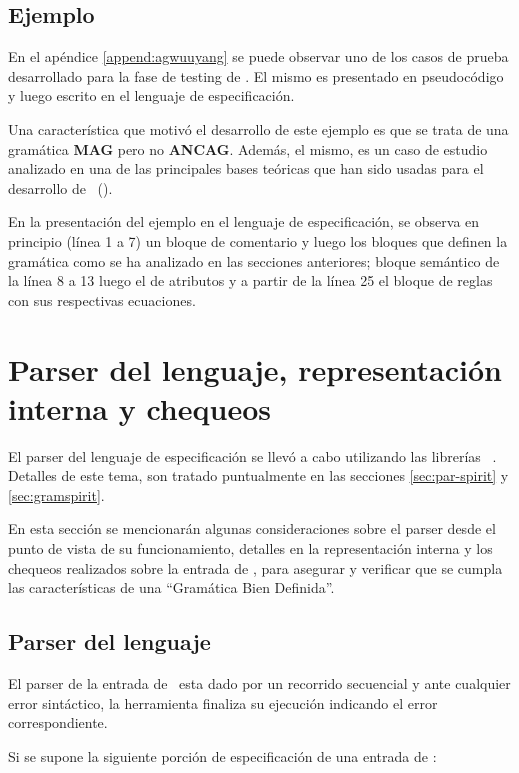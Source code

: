 \subsection{Ejemplo}

En el apéndice \ref{append:agwuuyang} se puede observar uno de los casos de prueba desarrollado para la fase de testing de \maggen. El mismo es presentado en pseudocódigo y luego escrito en el lenguaje de especificación. 

Una característica que motivó el desarrollo de este ejemplo es que se trata de una gramática \textbf{MAG} pero no \textbf{ANCAG}. Además, el mismo, es un caso de estudio analizado en una de las principales bases teóricas que han sido usadas para el desarrollo de \maggen\ (\cite{wuu-yang1}). 

En la presentación del ejemplo en el lenguaje de especificación, se observa en principio (línea 1 a 7) un bloque de comentario y luego los bloques que definen la gramática como se ha analizado en las secciones anteriores; bloque semántico de la línea 8 a 13 luego el de atributos y a partir de la línea 25 el bloque de reglas con sus respectivas ecuaciones.

 
\section{Parser del lenguaje, representación interna y chequeos}

El parser del lenguaje de especificación se llevó a cabo utilizando las librerías \boost\ \spirit. Detalles de este tema, son tratado puntualmente en las secciones \ref{sec:par-spirit} y \ref{sec:gramspirit}. 

En esta sección se mencionarán algunas consideraciones sobre el parser desde el punto de vista de su funcionamiento, detalles en la representación interna y los chequeos realizados sobre la entrada de \maggen, para asegurar y verificar que se cumpla las características de una ``Gramática Bien Definida''.

\subsection{Parser del lenguaje}
\label{subsec:parsers-leng}
El parser de la entrada de \maggen\ esta dado por un recorrido secuencial y ante cualquier error sintáctico, la herramienta finaliza su ejecución indicando el error correspondiente. 

Si se supone la siguiente porción de especificación de una entrada de \maggen:

